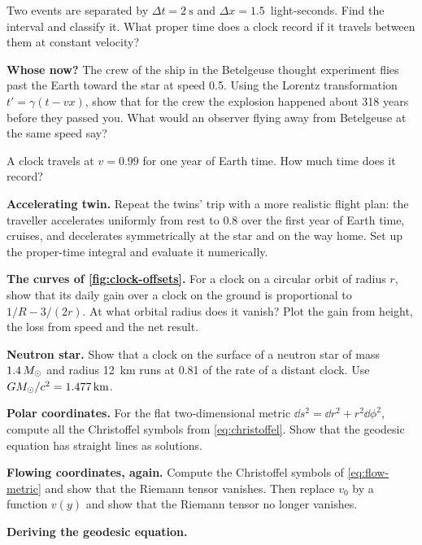 \begin{problems}
\item {} Two events are separated by $\Delta t = \SI{2}{\second}$ and
  $\Delta x = 1.5$~light-seconds. Find the interval and classify it. What proper
  time does a clock record if it travels between them at constant velocity?
\item {}\label{prob:simultaneity} \textbf{Whose now?} The crew of the ship
  in the Betelgeuse thought experiment flies past the Earth toward the star at
  speed 0.5. Using the Lorentz transformation $t' = \gamma(t - vx)$, show that
  for the crew the explosion happened about 318 years before they passed you.
  What would an observer flying away from Betelgeuse at the same speed say?
\item {} A clock travels at $v = 0.99$ for one year of Earth time. How much
  time does it record?
\item {} \textbf{Accelerating twin.} Repeat the twins' trip with a more
  realistic flight plan: the traveller accelerates uniformly from rest to $0.8$
  over the first year of Earth time, cruises, and decelerates symmetrically at
  the star and on the way home. Set up the proper-time integral and evaluate it
  numerically.
\item {}\label{prob:gps-curves} \textbf{The curves of \cref{fig:clock-offsets}.} For a
  clock on a circular orbit of radius $r$, show that its daily gain over a clock
  on the ground is proportional to $1/R - 3/(2r)$. At what orbital radius does it
  vanish? Plot the gain from height, the loss from speed and the net result.
\item {}\label{prob:neutron-star} \textbf{Neutron star.} Show that a clock
  on the surface of a neutron star of mass $1.4\,M_{\odot}$ and radius
  \SI{12}{\kilo\metre} runs at 0.81 of the rate of a distant clock. Use
  $GM_{\odot}/c^{2} = \SI{1.477}{\kilo\metre}$.
\item {} \textbf{Polar coordinates.} For the flat two-dimensional metric
  $\dd s^{2} = \dd r^{2} + r^{2}\dd\phi^{2}$, compute all the Christoffel symbols
  from \cref{eq:christoffel}. Show that the geodesic equation has straight lines
  as solutions.
\item {} \textbf{Flowing coordinates, again.} Compute the Christoffel
  symbols of \cref{eq:flow-metric} and show that the Riemann tensor vanishes.
  Then replace $v_{0}$ by a function $v(y)$ and show that the Riemann tensor no
  longer vanishes.
\item {}\label{prob:geodesic} \textbf{Deriving the geodesic equation.}

\end{problems}
